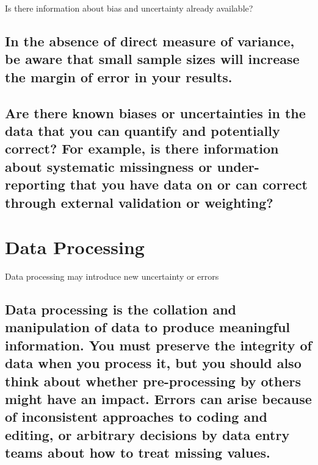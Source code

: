 \documentclass[]{book}
\begin{document}
 Is there information about bias and uncertainty already available?

\subsection{In the absence of direct measure of variance, be aware that
small sample sizes will increase the margin of error in your
results.}\label{in-the-absence-of-direct-measure-of-variance-be-aware-that-small-sample-sizes-will-increase-the-margin-of-error-in-your-results.}

\subsection{Are there known biases or uncertainties in the data that you
can quantify and potentially correct? For example, is there information
about systematic missingness or under-reporting that you have data on or
can correct through external validation or
weighting?}\label{are-there-known-biases-or-uncertainties-in-the-data-that-you-can-quantify-and-potentially-correct-for-example-is-there-information-about-systematic-missingness-or-under-reporting-that-you-have-data-on-or-can-correct-through-external-validation-or-weighting}

\section{Data Processing}\label{data-processing}

 Data processing may introduce new uncertainty or errors

\subsection{Data processing is the collation and manipulation of data to
produce meaningful information. You must preserve the integrity of data
when you process it, but you should also think about whether
pre-processing by others might have an impact. Errors can arise because
of inconsistent approaches to coding and editing, or arbitrary decisions
by data entry teams about how to treat missing
values.}\label{data-processing-is-the-collation-and-manipulation-of-data-to-produce-meaningful-information.-you-must-preserve-the-integrity-of-data-when-you-process-it-but-you-should-also-think-about-whether-pre-processing-by-others-might-have-an-impact.-errors-can-arise-because-of-inconsistent-approaches-to-coding-and-editing-or-arbitrary-decisions-by-data-entry-teams-about-how-to-treat-missing-values.}
\end{document}

